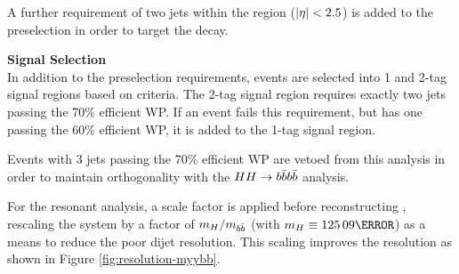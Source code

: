 A further requirement of two jets within the \btagging region ($|\eta| <2.5$) is added to the preselection in order to target the \Hbb decay.

\noindent\textbf{Signal Selection}\\
\indent In addition to the preselection requirements, events are selected into 1 and 2-tag signal regions based on \btagging criteria. The 2-tag signal region requires exactly two jets passing the 70\% efficient \btagging \gls{WP}. If an event fails this requirement, but has one \bjet passing the 60\% efficient \btagging \gls{WP}, it is added to the 1-tag signal region.

Events with 3 jets passing the 70\% efficient \btagging \gls{WP} are vetoed from this analysis in order to maintain orthogonality with the $HH \rightarrow b\bar{b} b\bar{b}$ analysis.


For the resonant analysis, a scale factor is applied before reconstructing \myybb, rescaling the \bb system by a factor of $m_{H}/m_{b\bar{b}}$ (with $m_H \equiv \unit{125.09}{\GeV}$) as a means to reduce the poor dijet resolution. This scaling improves the \myybb resolution as shown in Figure \ref{fig:resolution-myybb}.


